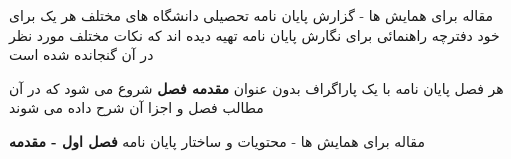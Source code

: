 \documentclass[14pt]{beamer}
\newcommand{\framefontsizelarge}{\fontsize{18pt}{0pt}\selectfont}
\newcommand{\frametitlefontsize}{\fontsize{20pt}{0pt}\selectfont}
\begin{document}
\begin{persian}
\begin{frame}[plain]{\frametitlefontsize مقاله برای همایش ها - گزارش پایان نامه تحصیلی}
		دانشگاه های مختلف هر یک برای خود دفترچه راهنمائی برای نگارش پایان نامه تهیه دیده اند که نکات مختلف مورد نظر در آن گنجانده شده است
		
		هر فصل پایان نامه با یک پاراگراف بدون عنوان \textbf{مقدمه فصل} شروع می شود که در آن مطالب فصل و اجزا آن شرح داده می شوند
	\end{frame}	
	
	\begin{frame}[plain]{\frametitlefontsize مقاله برای همایش ها - محتویات و ساختار پایان نامه}
		\framefontsizelarge
		\textbf{فصل اول - مقدمه}
	\end{frame}	

\end{persian}
\end{document}
